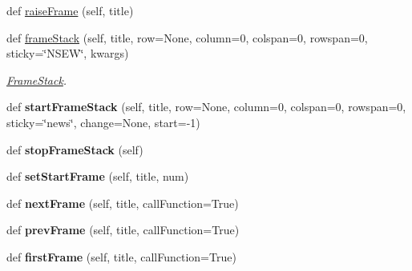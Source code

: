 \begin{DoxyCompactItemize}
def \hyperlink{class_python_01_g_u_i_1_1appjar_1_1gui_a6718c7252fc1d1392388c468a8cc5ce3}{raise\+Frame} (self, title)
\item 
\mbox{\label{class_python_01_g_u_i_1_1appjar_1_1gui_a10d157857cb3181f604ed96ffc64bf8b}} 
def \hyperlink{class_python_01_g_u_i_1_1appjar_1_1gui_a10d157857cb3181f604ed96ffc64bf8b}{frame\+Stack} (self, title, row=None, column=0, colspan=0, rowspan=0, sticky=\char`\"{}N\+S\+EW\char`\"{}, kwargs)
\begin{DoxyCompactList}\small\item\em \hyperlink{class_python_01_g_u_i_1_1appjar_1_1_frame_stack}{Frame\+Stack}. \end{DoxyCompactList}\item 
\mbox{\label{class_python_01_g_u_i_1_1appjar_1_1gui_a6f6df3fdf3093933494e8997ebbb5ca1}} 
def {\bfseries start\+Frame\+Stack} (self, title, row=None, column=0, colspan=0, rowspan=0, sticky=\char`\"{}news\char`\"{}, change=None, start=-\/1)
\item 
\mbox{\label{class_python_01_g_u_i_1_1appjar_1_1gui_ad3430378f0858fdd8adbc916e1290fff}} 
def {\bfseries stop\+Frame\+Stack} (self)
\item 
\mbox{\label{class_python_01_g_u_i_1_1appjar_1_1gui_aa46e27c9bcf029931d64a38df93542ea}} 
def {\bfseries set\+Start\+Frame} (self, title, num)
\item 
\mbox{\label{class_python_01_g_u_i_1_1appjar_1_1gui_a6324584445f6dd6a3777c8e6af341cd6}} 
def {\bfseries next\+Frame} (self, title, call\+Function=True)
\item 
\mbox{\label{class_python_01_g_u_i_1_1appjar_1_1gui_a24ccb3784a35dafdfa566c4987a59fb9}} 
def {\bfseries prev\+Frame} (self, title, call\+Function=True)
\item 
\mbox{\label{class_python_01_g_u_i_1_1appjar_1_1gui_a1dd0e71d86c846eb9aa0a955ba703387}} 
def {\bfseries first\+Frame} (self, title, call\+Function=True)
\item 

\end{DoxyCompactItemize}
